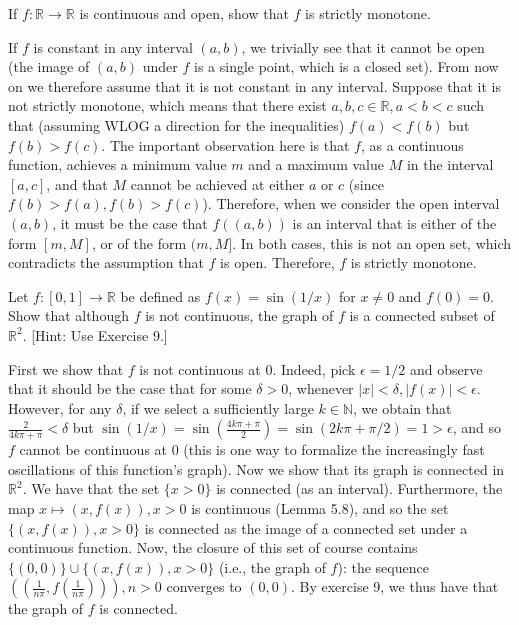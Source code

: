 \begin{exercise}{15}
    If $f: \mathbb{R} \rightarrow \mathbb{R}$ is continuous and open, show that $f$ is strictly monotone.
\end{exercise}

\begin{solution}
    
    If $f$ is constant in any interval $(a, b)$, we trivially see that it cannot be open (the image of $(a, b)$ under $f$ is a single point, which is a closed set).
    From now on we therefore assume that it is not constant in any interval.
    Suppose that it is not strictly monotone, which means that there exist $a, b, c \in \mathbb{R}, a < b < c$ such that (assuming WLOG a direction for the inequalities) $f(a) < f(b)$ but $f(b) > f(c)$.
    The important observation here is that $f$, as a continuous function, achieves a minimum value $m$ and a maximum value $M$ in the interval $[a, c]$, and that $M$ cannot be achieved at either $a$ or $c$ (since $f(b) > f(a), f(b) > f(c)$).
    Therefore, when we consider the open interval $(a, b)$, it must be the case that $f((a, b))$ is an interval that is either of the form $[m, M]$, or of the form $(m, M]$.
    In both cases, this is not an open set, which contradicts the assumption that $f$ is open.
    Therefore, $f$ is strictly monotone.
\end{solution}

\begin{exercise}{26}
    Let $f: [0, 1] \rightarrow \mathbb{R}$ be defined as $f(x) = \sin(1/x)$ for $x \neq 0$ and $f(0) = 0$.
    Show that although $f$ is not continuous, the graph of $f$ is a connected subset of $\mathbb{R}^2$.
    [Hint: Use Exercise 9.]
\end{exercise}

\begin{solution}
    
    First we show that $f$ is not continuous at 0.
    Indeed, pick $\epsilon = 1/2$ and observe that it should be the case that for some $\delta > 0$, whenever $\lvert x \rvert < \delta, \lvert f(x) \rvert < \epsilon$.
    However, for any $\delta$, if we select a sufficiently large $k \in \mathbb{N}$, we obtain that $\frac{2}{4k \pi + \pi} < \delta$ but $\sin(1/x) = \sin(\frac{4k \pi + \pi}{2}) = \sin(2k\pi + \pi/2) = 1 > \epsilon$, and so $f$ cannot be continuous at 0 (this is one way to formalize the increasingly fast oscillations of this function's graph).
    Now we show that its graph is connected in $\mathbb{R}^2$.
    We have that the set $\{x > 0\}$ is connected (as an interval).
    Furthermore, the map $x \mapsto (x, f(x)), x > 0$ is continuous (Lemma 5.8), and so the set $\{(x, f(x)), x > 0\}$ is connected as the image of a connected set under a continuous function.
    Now, the closure of this set of course contains $\{(0, 0)\} \cup \{(x, f(x)), x > 0\}$ (i.e., the graph of $f$): the sequence $((\frac{1}{n\pi}, f(\frac{1}{n\pi}))), n > 0$ converges to $(0, 0)$.
    By exercise 9, we thus have that the graph of $f$ is connected.
\end{solution}

